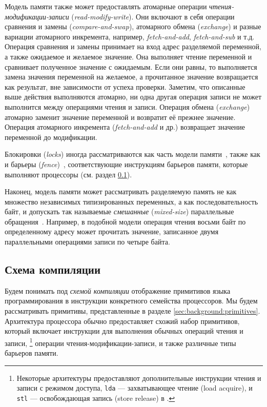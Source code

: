 Модель памяти также может предоставлять атомарные операции 
\emph{чтения-модификации-записи} (\emph{read-modify-write}).
Они включают в себя операции сравнения и замены (\emph{compare-and-swap}), 
атомарного обмена (\emph{exchange}) и разные вариации атомарного инкремента, 
например, \emph{fetch-and-add}, \emph{fetch-and-sub} и т.д. 
Операция сравнения и замены принимает на вход 
адрес разделяемой переменной, а также ожидаемое и желаемое значение.
Она выполняет чтение переменной и сравнивает полученное значение 
с ожидаемым. Если они равны, то выполняется замена значения переменной 
на желаемое, а прочитанное значение возвращается как результат, 
вне зависимости от успеха проверки. 
Заметим, что описанные выше действия выполняются атомарно, 
ни одна другая операция записи не может выполнится между 
операциями чтения и записи.
Операция обмена (\emph{exchange}) атомарно 
заменит значение переменной и возвратит её прежнее значение. 
Операция атомарного инкремента (\emph{fetch-and-add} и др.)  возвращает значение переменной до модификации.  

Блокировки (\emph{locks}) иногда рассматриваются 
как часть модели памяти~\cite{Manson-al:POPL05}, 
также как и барьеры (\emph{fence})~\cite{Batty-al:POPL11},
соответствующие инструкциям барьеров памяти, 
которые выполняют процессоры  
(см. раздел \cref{sec:background:compile}). 

Наконец, модель памяти может рассматривать разделяемую память 
не как множество независимых типизированных переменных, 
а как последовательность байт, и допускать 
так называемые \emph{смешанные} (\emph{mixed-size}) 
параллельные обращения~\cite{Flur-al:POPL17}. 
Например, в подобной модели операция чтения восьми байт по определенному адресу
может прочитать значение, записанное двумя параллельными 
операциями записи по четыре байта.

\subsection{Схема компиляции}
\label{sec:background:compile}

Будем понимать под \emph{схемой компиляции}   отображение
примитивов языка программирования в инструкции 
конкретного семейства процессоров.  
Мы будем рассматривать примитивы, представленные в 
разделе \cref{sec:background:primitives}.
Архитектура процессора обычно предоставляет 
схожий набор примитивов, который включает 
инструкции для выполнения обычных операций чтения и записи,%
\footnote{Некоторые архитектуры
предоставляют дополнительные инструкции чтения и 
записи с режимом доступа, \eg 
\eg \texttt{lda} --- захватывающее чтение (load acquire), 
и \texttt{stl} --- освобождающая запись (store release) в .} 
операции чтения-модификации-записи, и 
также различные типы барьеров памяти.


